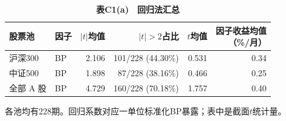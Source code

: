 \begingroup\small\setlength{\tabcolsep}{4pt}
\begin{table}[H]\centering
\caption*{\textbf{表C1(a)　回归法汇总}}
\begin{tabular*}{\textwidth}{@{\extracolsep{\fill}}llrrrr@{}}\toprule
股票池 & 因子 & $|t|$均值 & $|t|>2$占比 & $t$均值 & \makecell{因子收益均值\\（\%/月）} \\ \midrule
沪深300 & BP & 2.106 & 101/228 (44.30\%) & 0.531 & 0.34 \\
中证500 & BP & 1.898 & 87/228 (38.16\%) & 0.466 & 0.25 \\
全部 A 股 & BP & 4.729 & 160/228 (70.18\%) & 1.757 & 0.40 \\
\bottomrule\end{tabular*}
\par\smallskip\raggedright\footnotesize 各池均有228期。回归系数对应一单位标准化BP暴露；表中是截面$t$统计量。\end{table}
\endgroup
